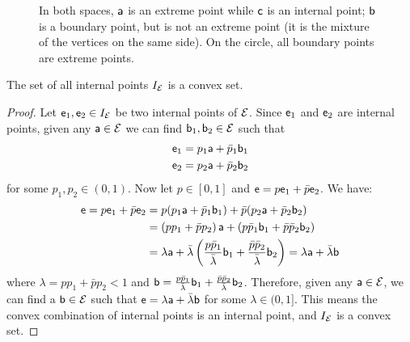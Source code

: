 \begin{mathSection}
\begin{figure}[H]
	\caption{In both spaces, $\ens[a]$ is an extreme point while $\ens[c]$ is an internal point; $\ens[b]$ is a boundary point, but is not an extreme point (it is the mixture of the vertices on the same side). On the circle, all boundary points are extreme points.}
\end{figure}

\begin{prop}\label{pm-es-internalPointsConvex}
	The set of all internal points $I_{\Ens}$ is a convex set.
\end{prop}
\begin{proof}
Let $\ens_1, \ens_2 \in I_{\Ens}$ be two internal points of $\Ens$. Since $\ens_1$ and $\ens_2$ are internal points, given any $\ens[a] \in \Ens$ we can find $\ens[b]_1, \ens[b]_2 \in \Ens$ such that 
\begin{equation}
	\begin{aligned}
	\ens_1 & =p_1 \ens[a]+\bar{p}_1 \ens[b]_1 \\
	\ens_2 & =p_2 \ens[a]+\bar{p}_2 \ens[b]_2
	\end{aligned}
\end{equation}
for some $p_1, p_2 \in (0,1)$. Now let $p \in [0,1]$ and $\ens = p \ens_1+\bar{p} \ens_2$. We have:
\begin{equation}
\begin{aligned}
	\ens = p \ens_1+\bar{p} \ens_2 &= p(p_1 \ens[a]+\bar{p}_1 \ens[b]_1) + \bar{p} (p_2 \ens[a]+\bar{p}_2 \ens[b]_2)\\
	&=\left(p p_1+\bar{p} p_2\right) \ens[a]+\left(p \bar{p}_{1} \ens[b]_1+\bar{p} \bar{p}_{2} \ens[b]_2\right) \\
	&=\lambda \ens[a] + \bar{\lambda} \left(\frac{p \bar{p}_{1}}{\bar{\lambda}} \ens[b]_1+\frac{\bar{p} \bar{p}_{2}}{\bar{\lambda}} \ens[b]_2\right) = \lambda \ens[a] + \bar{\lambda} \ens[b] \\
\end{aligned}
\end{equation}
where $\lambda = p p_1+\bar{p} p_2 < 1$ and $\ens[b] = \frac{p \bar{p}_{1}}{\bar{\lambda}} \ens[b]_1+\frac{\bar{p} \bar{p}_{2}}{\bar{\lambda}} \ens[b]_2$. Therefore, given any $\ens[a] \in \Ens$, we can find a $\ens[b] \in \Ens$ such that $\ens = \lambda \ens[a] + \bar{\lambda} \ens[b]$ for some $\lambda \in (0,1]$. This means the convex combination of internal points is an internal point, and $I_{\Ens}$ is a convex set.
\end{proof}
\end{mathSection}

